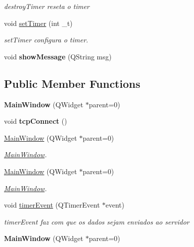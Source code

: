 \begin{DoxyCompactItemize}
\begin{DoxyCompactList}\small\item\em destroy\+Timer reseta o timer \end{DoxyCompactList}\item 
void \mbox{\hyperlink{class_main_window_ab5db2dcd9b9592285a18fa7d19256e6a}{set\+Timer}} (int \+\_\+t)
\begin{DoxyCompactList}\small\item\em set\+Timer configura o timer. \end{DoxyCompactList}\item 
\mbox{\label{class_main_window_a0edca0c59fb238bea02b248c90b89698}} 
void {\bfseries show\+Message} (Q\+String msg)
\end{DoxyCompactItemize}
\subsection*{Public Member Functions}
\begin{DoxyCompactItemize}
\item 
\mbox{\label{class_main_window_a8b244be8b7b7db1b08de2a2acb9409db}} 
{\bfseries Main\+Window} (Q\+Widget $\ast$parent=0)
\item 
\mbox{\label{class_main_window_ac5b669957c442b6eb68573dacfce33e1}} 
void {\bfseries tcp\+Connect} ()
\item 
\mbox{\hyperlink{class_main_window_a8b244be8b7b7db1b08de2a2acb9409db}{Main\+Window}} (Q\+Widget $\ast$parent=0)
\begin{DoxyCompactList}\small\item\em \mbox{\hyperlink{class_main_window}{Main\+Window}}. \end{DoxyCompactList}\item 
\mbox{\hyperlink{class_main_window_a8b244be8b7b7db1b08de2a2acb9409db}{Main\+Window}} (Q\+Widget $\ast$parent=0)
\begin{DoxyCompactList}\small\item\em \mbox{\hyperlink{class_main_window}{Main\+Window}}. \end{DoxyCompactList}\item 
void \mbox{\hyperlink{class_main_window_aaa425b1554af3c1f58cc70b4815082ae}{timer\+Event}} (Q\+Timer\+Event $\ast$event)
\begin{DoxyCompactList}\small\item\em timer\+Event faz com que os dados sejam enviados ao servidor \end{DoxyCompactList}\item 
\mbox{\label{class_main_window_a8b244be8b7b7db1b08de2a2acb9409db}} 
{\bfseries Main\+Window} (Q\+Widget $\ast$parent=0)
\end{DoxyCompactItemize}


